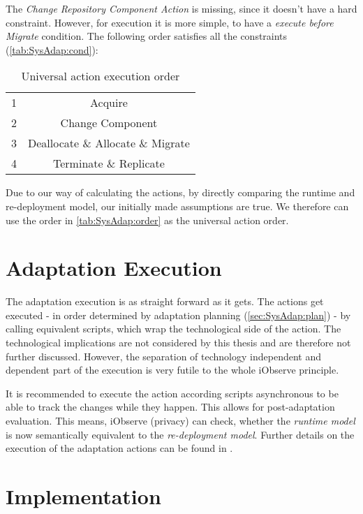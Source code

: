 The \textit{Change Repository Component Action} is missing, since it doesn't have a hard constraint. However, for execution it is more simple, to have a \textit{execute before Migrate} condition. The following order satisfies all the constraints (\autoref{tab:SysAdap:cond}):

\begin{table}[h]
	\centering
	\begin{tabular}{ r | c}
		\hline
		1 & Acquire\\
		2 & Change Component\\
		3 & Deallocate \& Allocate \& Migrate \\
		4 & Terminate \& Replicate\\
		\hline
	\end{tabular}
	\caption{Universal action execution order}
	\label{tab:SysAdap:order}
\end{table}

Due to our way of calculating the actions, by directly comparing the runtime and re-deployment model, our initially made assumptions are true. We therefore can use the order in \autoref{tab:SysAdap:order} as the universal action order.


\section{Adaptation Execution}
\label{sec:SysAdap:exec}

The adaptation execution is as straight forward as it gets. The actions get executed - in order determined by adaptation planning (\autoref{sec:SysAdap:plan}) - by calling equivalent scripts, which wrap the technological side of the action. The technological implications are not considered by this thesis and are therefore not further discussed. However, the separation of technology independent and dependent part of the execution is very futile to the whole iObserve principle.

It is recommended to execute the action according scripts asynchronous to be able to track the changes while they happen. This allows for post-adaptation evaluation. This means, iObserve (privacy) can check, whether the \textit{runtime model} is now semantically equivalent to the \textit{re-deployment model}. Further details on the execution of the adaptation actions can be found in \cite{TobiasPoppke.20170626}.


\section{Implementation}
\label{sec:SysAdap:impl}


